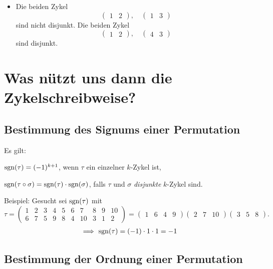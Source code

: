 \documentclass{../../algblatt}
\begin{document}
\begin{itemize}
\item Die beiden Zykel
\[ \begin{pmatrix}1 & 2\end{pmatrix}, \quad \begin{pmatrix}1 & 3\end{pmatrix}
\]
sind nicht disjunkt. Die beiden Zykel
\[ \begin{pmatrix}1 & 2\end{pmatrix}, \quad \begin{pmatrix}4 & 3\end{pmatrix}
\]
sind disjunkt.
\end{itemize}


\section{Was nützt uns dann die Zykelschreibweise?}

\subsection*{Bestimmung des Signums einer Permutation}

Es gilt:
\begin{description}
\item $\operatorname{sgn}(\tau)=(-1)^{k+1}$, wenn $\tau$ ein einzelner $k$-Zykel ist,
\item $\operatorname{sgn}(\tau \circ \sigma)= \operatorname{sgn}(\tau) \cdot \operatorname{sgn}(\sigma)$, falls $\tau$
und $\sigma$ \emph{disjunkte} $k$-Zykel sind.
\end{description}
Beispiel: Gesucht sei $\operatorname{sgn}(\tau)$ mit
\[ \tau = \begin{pmatrix}
  1 & 2 & 3 & 4 & 5 & 6 & 7 & 8 & 9 & 10 \\
  6 & 7 & 5 & 9 & 8 & 4 & 10 & 3 & 1 & 2
\end{pmatrix} =
\begin{pmatrix}
1 & 6 & 4 & 9
\end{pmatrix}
\begin{pmatrix}
2 & 7 & 10
\end{pmatrix}
\begin{pmatrix}
3 & 5 & 8
\end{pmatrix}. \]
\begin{align*}
\Longrightarrow \ \operatorname{sgn}(\tau)= (-1)\cdot 1 \cdot 1= -1
\end{align*}


\subsection*{Bestimmung der Ordnung einer Permutation}
\end{document}
